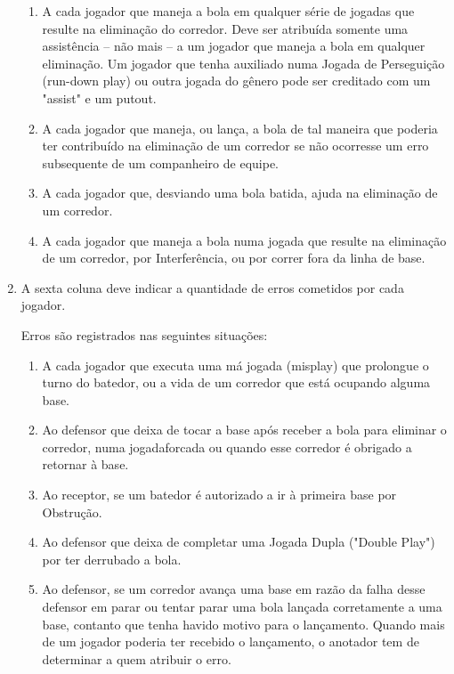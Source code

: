 \begin{enumerate}[label=\arabic*)]
				\begin{enumerate}[label=(\alph*)]
					\item A cada jogador que maneja a bola em qualquer série de jogadas que resulte na eliminação do corredor. Deve ser atribuída somente uma assistência -- não mais -- a um jogador que maneja a bola em qualquer eliminação. Um jogador que tenha auxiliado numa Jogada de Perseguição (\gls{run-down play}) ou outra jogada do gênero pode ser creditado com um "assist" e um \gls{putout}.
					\item A cada jogador que maneja, ou lança, a bola de tal maneira que poderia ter contribuído na eliminação de um corredor se não ocorresse um erro subsequente de um companheiro de equipe.
					\item A cada jogador que, desviando uma bola batida, ajuda na eliminação de um corredor.
					\item A cada jogador que maneja a bola numa jogada que resulte na eliminação de um corredor, por Interferência, ou por correr fora da linha de base.
				\end{enumerate}
			\item A sexta coluna deve indicar a quantidade de erros cometidos por cada jogador.

			Erros são registrados nas seguintes situações:

				\begin{enumerate}[label=(\alph*)]
				\item A cada jogador que executa uma má jogada (\gls{misplay}) que prolongue o turno do batedor, ou a vida de um corredor que está ocupando alguma base.
				\item Ao defensor que deixa de tocar a base após receber a bola para eliminar o corredor, numa \gls{jogadaforcada} ou quando esse corredor é obrigado a retornar à base.
				\item Ao receptor, se um batedor é autorizado a ir à primeira base por Obstrução.
				\item Ao defensor que deixa de completar uma Jogada Dupla ("Double Play") por ter derrubado a bola.
				\item Ao defensor, se um corredor avança uma base em razão da falha desse defensor em parar ou tentar parar uma bola lançada corretamente a uma base, contanto que tenha havido motivo para o lançamento. Quando mais de um jogador poderia ter recebido o lançamento, o anotador tem de determinar a quem atribuir o erro.
			\end{enumerate}

		\end{enumerate}


